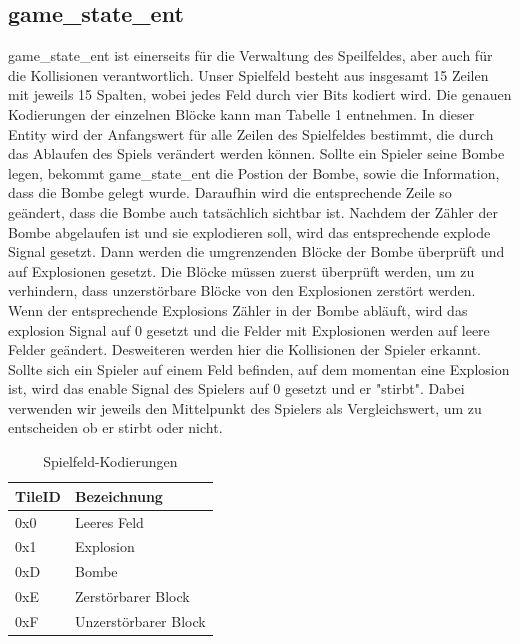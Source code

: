 \documentclass[parskip=full]{scrartcl}
\begin{document}
			\subsection{game\_state\_ent}
				game\_state\_ent ist einerseits für die Verwaltung des Speilfeldes, aber auch für die Kollisionen verantwortlich. Unser Spielfeld besteht aus insgesamt 15 Zeilen mit jeweils 15 Spalten, wobei jedes Feld durch vier Bits kodiert wird. Die genauen Kodierungen der einzelnen Blöcke kann man Tabelle 1 entnehmen. In dieser Entity wird der Anfangswert für alle Zeilen des Spielfeldes bestimmt, die durch das Ablaufen des Spiels verändert werden können. \newline
				Sollte ein Spieler seine Bombe legen, bekommt game\_state\_ent die Postion der Bombe, sowie die Information, dass die Bombe gelegt wurde. Daraufhin wird die entsprechende Zeile so geändert, dass die Bombe auch tatsächlich sichtbar ist. Nachdem der Zähler der Bombe abgelaufen ist und sie explodieren soll, wird das entsprechende explode Signal gesetzt. Dann werden die umgrenzenden Blöcke der Bombe überprüft und auf Explosionen gesetzt. Die Blöcke müssen zuerst überprüft werden, um zu verhindern, dass unzerstörbare Blöcke von den Explosionen zerstört werden. Wenn der entsprechende Explosions Zähler in der Bombe abläuft, wird das explosion Signal auf 0 gesetzt und die Felder mit Explosionen werden auf leere Felder geändert. \newline
				Desweiteren werden hier die Kollisionen der Spieler erkannt. Sollte sich ein Spieler auf einem Feld befinden, auf dem momentan eine Explosion ist, wird das enable Signal des Spielers auf 0 gesetzt und er "stirbt". Dabei verwenden wir jeweils den Mittelpunkt des Spielers als Vergleichswert, um zu entscheiden ob er stirbt oder nicht. \newline
				
				\begin{table}[H]
					\centering
					\label{tileCode}
					\begin{tabular}{|l|l|}
						\hline
						\textbf{TileID} & \textbf{Bezeichnung}      \\ \hline
						0x0           & Leeres Feld               \\ \hline
						0x1           & Explosion                 \\ \hline
						0xD           & Bombe                     \\ \hline
						0xE           & Zerstörbarer Block        \\ \hline
						0xF           & Unzerstörbarer Block      \\ \hline
					\end{tabular}
					\caption{Spielfeld-Kodierungen}
				\end{table}
\end{document}
